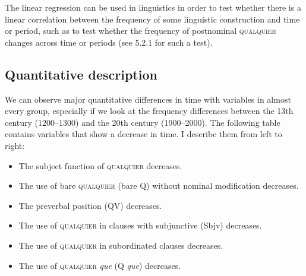 \documentclass[output=paper]{langscibook}
\begin{document}
The linear regression can be used in linguistics in order to test whether there is a linear correlation between the frequency of some linguistic construction and time or period, such as to test whether the frequency of postnominal \textsc{qualquier} changes across time or periods (see 5.2.1 for such a test).

\subsection{Quantitative description}

We can observe major quantitative differences in time with variables in almost every group, especially if we look at the frequency differences between the 13th century (1200–1300) and the 20th century (1900–2000). The following table contains variables that show a decrease in time. I describe them from left to right: 

\begin{itemize}
\item The subject function of \textsc{qualquier} decreases.
\item The use of bare \textsc{qualquier} (bare Q) without nominal modification decreases.
\item The preverbal position (QV) decreases. 
\item The use of \textsc{qualquier} in clauses with subjunctive (Sbjv) decreases. 
\item The use of \textsc{qualquier} in subordinated clauses decreases.
\item The use of \textsc{qualquier} \textit{que} (Q \textit{que}) decreases.
\end{itemize}
\end{document}
